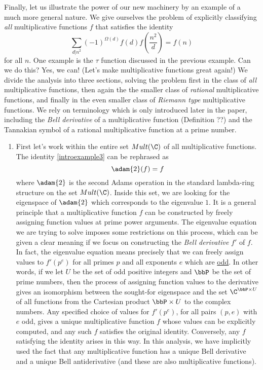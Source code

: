 \documentclass[a4paper]{article}
\begin{document}
\begin{example}
Finally, let us illustrate the power of our new machinery by an example of a much more general nature. We give ourselves the problem of explicitly classifying \emph{all} multiplicative functions $f$ that satisfies the identity 
\begin{equation} \label{introexample3}
\sum_{d \vert n^2} (-1)^{\Omega(d)} f(d) f (\frac{n^2}{d}) = f(n)  
\end{equation}
for all $n$. One example is the $\tau$ function discussed in the previous example. Can we do this? Yes, we can! (Let's make multiplicative functions great again!) We divide the analysis into three sections, solving the problem first in the class of \emph{all} multiplicative functions, then again the the smaller class of \emph{rational} multiplicative functions, and finally in the even smaller class of \emph{Riemann type} multiplicative functions. We rely on terminology which is only introduced later in the paper, including the \emph{Bell derivative} of a multiplicative function (Definition ??) and the Tannakian symbol of a rational multiplicative function at a prime number. 


\begin{enumerate}
\item First let's work within the entire set $Mult(\C)$ of all multiplicative functions. The identity \ref{introexample3} can be rephrased as 
$$ \adam{2}(f) = f  $$
where $\adam{2}$ is the second Adams operation in the standard lambda-ring structure on the set $Mult(\C)$. Inside this set, we are looking for the eigenspace of $\adam{2}$ which corresponds to the eigenvalue $1$. It is a general principle that a multiplicative function $f$ can be constructed by freely assigning function values at prime power arguments. The eigenvalue equation we are trying to solve imposes some restrictions on this process, which can be given a clear meaning if we focus on constructing the \emph{Bell derivative} $f'$ of $f$. In fact, the eigenvalue equation means precisely that we can freely assign values to $f'(p^e)$ for all primes $p$ and all exponents $e$ which are \underline{odd}. In other words, if we let $U$ be the set of odd positive integers and $\bbP$ be the set of prime numbers, then the process of assigning function values to the derivative gives an isomorphism between the sought-for eigenspace and the set $\C^{\bbP \times U}$ of all functions from the Cartesian product $\bbP \times U$ to the complex numbers. Any specified choice of values for $f'(p^e)$, for all pairs $(p, e)$  with $e$ odd, gives a unique multiplicative function $f$ whose values can be explicitly computed, and any such $f$ satisfies the original identity. Conversely, any $f$ satisfying the identity arises in this way. In this analysis, we have implicitly used the fact that any multiplicative function has a unique Bell derivative and a unique Bell antiderivative (and these are also multiplicative functions). 
 

\end{enumerate}
\end{example}
\end{document}
